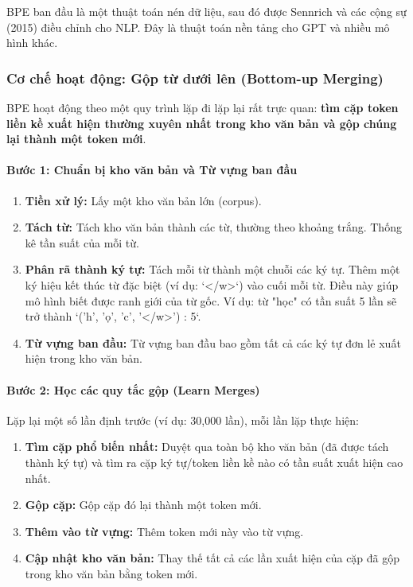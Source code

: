 BPE ban đầu là một thuật toán nén dữ liệu, sau đó được Sennrich và các cộng sự (2015) \cite{sennrich2015neural} điều chỉnh cho NLP. Đây là thuật toán nền tảng cho GPT và nhiều mô hình khác.

\subsubsection{Cơ chế hoạt động: Gộp từ dưới lên (Bottom-up Merging)}
BPE hoạt động theo một quy trình lặp đi lặp lại rất trực quan: \textbf{tìm cặp token liền kề xuất hiện thường xuyên nhất trong kho văn bản và gộp chúng lại thành một token mới}.

\paragraph{Bước 1: Chuẩn bị kho văn bản và Từ vựng ban đầu}
\begin{enumerate}
    \item \textbf{Tiền xử lý:} Lấy một kho văn bản lớn (corpus).
    \item \textbf{Tách từ:} Tách kho văn bản thành các từ, thường theo khoảng trắng. Thống kê tần suất của mỗi từ.
    \item \textbf{Phân rã thành ký tự:} Tách mỗi từ thành một chuỗi các ký tự. Thêm một ký hiệu kết thúc từ đặc biệt (ví dụ: `</w>`) vào cuối mỗi từ. Điều này giúp mô hình biết được ranh giới của từ gốc. Ví dụ: từ "học" có tần suất 5 lần sẽ trở thành `('h', 'ọ', 'c', '</w>') : 5`.
    \item \textbf{Từ vựng ban đầu:} Từ vựng ban đầu bao gồm tất cả các ký tự đơn lẻ xuất hiện trong kho văn bản.
\end{enumerate}

\paragraph{Bước 2: Học các quy tắc gộp (Learn Merges)}
Lặp lại một số lần định trước (ví dụ: 30,000 lần), mỗi lần lặp thực hiện:
\begin{enumerate}
    \item \textbf{Tìm cặp phổ biến nhất:} Duyệt qua toàn bộ kho văn bản (đã được tách thành ký tự) và tìm ra cặp ký tự/token liền kề nào có tần suất xuất hiện cao nhất.
    \item \textbf{Gộp cặp:} Gộp cặp đó lại thành một token mới.
    \item \textbf{Thêm vào từ vựng:} Thêm token mới này vào từ vựng.
    \item \textbf{Cập nhật kho văn bản:} Thay thế tất cả các lần xuất hiện của cặp đã gộp trong kho văn bản bằng token mới.
\end{enumerate}

